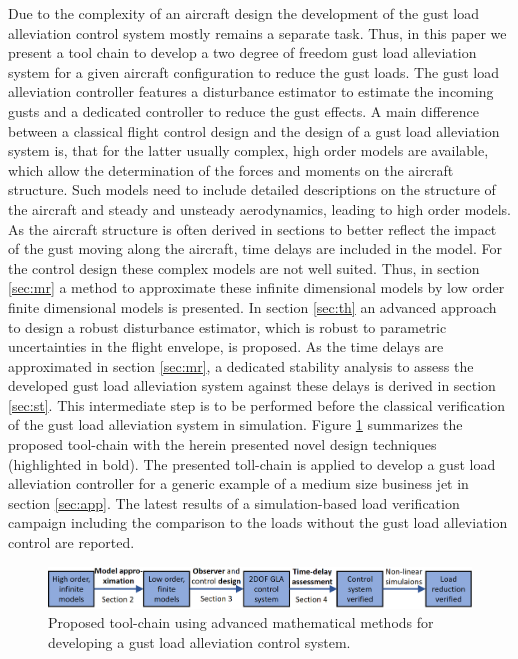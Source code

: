 \documentclass[graybox]{svmult}
\begin{document}
Due to the complexity of an aircraft design the development of the gust load alleviation control system mostly remains a separate task. Thus, in this paper we present a tool chain to develop a two degree of freedom gust load alleviation system for a given aircraft configuration to reduce the gust loads. The gust load alleviation controller features a disturbance estimator to estimate the incoming gusts and a dedicated controller to reduce the gust effects. A main difference between a classical flight  control design and the design of a gust load alleviation system is, that for the latter usually complex, high order models are available, which allow the determination of the forces and moments on the  aircraft structure. Such models need to include detailed descriptions on the structure of the aircraft and steady and unsteady aerodynamics, leading to high order models. As the aircraft structure is often derived in sections to better reflect the impact of the gust moving along the aircraft, time delays are included in the model. For the control design these complex models are not well suited. Thus, in section \ref{sec:mr} a method to approximate  these infinite dimensional models by low order finite dimensional models is presented. In section \ref{sec:th} an advanced approach to design a robust disturbance estimator, which is robust to parametric uncertainties in the flight envelope, is proposed.
As the time delays are approximated in section \ref{sec:mr}, a dedicated stability analysis to assess the developed gust load alleviation system against these delays is derived in section \ref{sec:st}. This intermediate step is to be performed before the classical verification of the gust load alleviation system in simulation. Figure \ref{fig:toolchain} summarizes the proposed  tool-chain  with the  herein presented novel design techniques (highlighted in bold).  The presented toll-chain is applied to develop a gust load alleviation controller for a generic example of a medium size business jet in section \ref{sec:app}. The latest  results of a simulation-based load verification campaign including the comparison to  the loads  without  the gust load alleviation control are reported.

\begin{figure}[bth]
	\centering
		\includegraphics[width=1\textwidth]{strct.png}
	\caption{Proposed tool-chain using advanced mathematical methods for developing a gust load alleviation control system.}
	\label{fig:toolchain}	
\end{figure}
\end{document}
